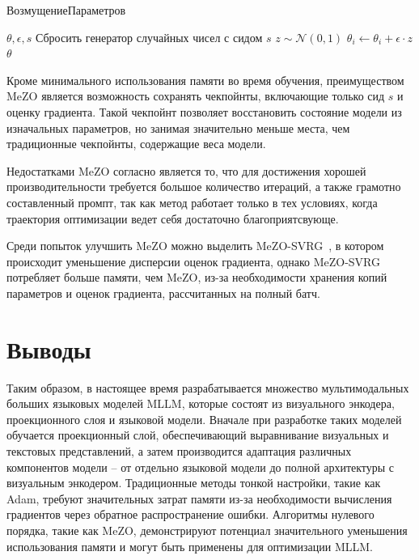 \documentclass[LI,KR]{HSEUniversity}
\begin{document}
\begin{algorithm}[H]
\caption{ВозмущениеПараметров}
\begin{algorithmic}[1]
\Require $\theta, \epsilon, s$
\State Сбросить генератор случайных чисел с сидом $s$ 
    \State $z \sim \mathcal{N}(0, 1)$
    \State $\theta_i \leftarrow \theta_i + \epsilon \cdot z$ 
\EndFor
\State \Return $\theta$
\end{algorithmic}
\end{algorithm}

Кроме минимального использования памяти во время обучения,
преимуществом MeZO является возможность сохранять чекпойнты,
включающие только сид $s$ и оценку градиента.
Такой чекпойнт позволяет восстановить состояние модели из изначальных параметров, но
занимая значительно меньше места, чем традиционные чекпойнты, содержащие веса модели.

Недостатками MeZO согласно \cite{mezo} является то, что
для достижения хорошей производительности требуется большое количество итераций,
а также грамотно составленный промпт, так как метод работает только в тех условиях,
когда траектория оптимизации ведет себя достаточно благоприятсвующе.

Среди попыток улучшить MeZO можно выделить MeZO-SVRG~\cite{mezo-svrg}, в котором происходит уменьшение дисперсии оценок градиента,
однако MeZO-SVRG потребляет больше памяти, чем MeZO, из-за необходимости хранения копий параметров и оценок градиента, рассчитанных на полный батч.

\section*{Выводы}

Таким образом, в настоящее время разрабатывается множество мультимодальных больших языковых моделей MLLM, которые состоят из визуального энкодера, проекционного слоя и языковой модели.
Вначале при разработке таких моделей обучается проекционный слой, обеспечивающий выравнивание визуальных и текстовых представлений,
а затем производится адаптация различных компонентов модели – от отдельно языковой модели до полной архитектуры с визуальным энкодером.
Традиционные методы тонкой настройки, такие как Adam, требуют значительных затрат памяти из-за необходимости вычисления градиентов через обратное распространение ошибки.
Алгоритмы нулевого порядка, такие как MeZO, демонстрируют потенциал значительного уменьшения использования памяти и могут быть применены для оптимизации MLLM.
\end{document}
